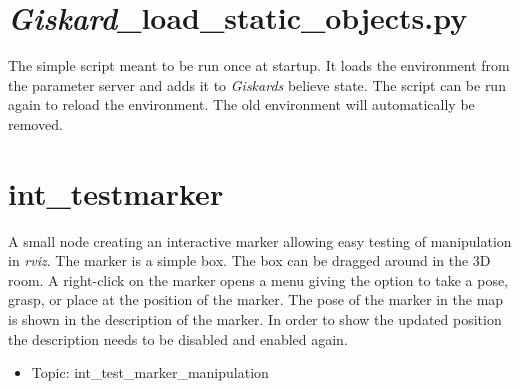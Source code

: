 \documentclass[main.tex]{subfiles}
\begin{document}
			\section{\textit{Giskard}\_load\_static\_objects.py} 
			The simple script meant to be run once at startup. It loads the environment from the parameter server and adds it to \textit{Giskards} believe state. 
			The script can be run again to reload the environment. The old environment will automatically be removed.
			
			 
			\section{int\_testmarker}
			A small node creating an interactive marker allowing easy testing of manipulation in \textit{rviz}. The marker is a simple box. The box can be dragged around in the 3D room. A right-click on the marker opens a menu giving the option to take a pose, grasp, or place at the position of the marker. The pose of the marker in the map is shown in the description of the marker. In order to show the updated position the description needs to be disabled and enabled again.
			\begin{itemize}
				\item Topic: int\_test\_marker\_manipulation
			\end{itemize}

			
	\endgroup
\end{document}
